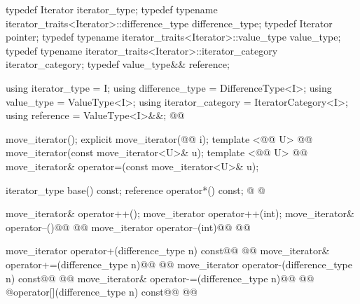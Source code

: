 %
\begin{codeblock}
namespace std {
  template <@@>
    @@
  class move_iterator {
  public:
\end{codeblock}\begin{removedblock}\begin{codeblock}
    typedef Iterator                                              iterator_type;
    typedef typename iterator_traits<Iterator>::difference_type   difference_type;
    typedef Iterator                                              pointer;
    typedef typename iterator_traits<Iterator>::value_type        value_type;
    typedef typename iterator_traits<Iterator>::iterator_category iterator_category;
    typedef value_type&&                                          reference;
\end{codeblock}\end{removedblock}\begin{addedblock}\begin{codeblock}
    using iterator_type = I;
    using difference_type = DifferenceType<I>;
    using value_type = ValueType<I>;
    using iterator_category = IteratorCategory<I>;
    using reference = ValueType<I>&&;
    @@
\end{codeblock}\end{addedblock}\begin{codeblock}

    move_iterator();
    explicit move_iterator(@@ i);
    template <@@ U>
      @@
    move_iterator(const move_iterator<U>& u);
    template <@@ U>
      @@
    move_iterator& operator=(const move_iterator<U>& u);

    iterator_type base() const;
    reference operator*() const;
    @ @

    move_iterator& operator++();
    move_iterator operator++(int);
    move_iterator& operator--()@\removed{;}@
      @@
    move_iterator operator--(int)@\removed{;}@
      @@

    move_iterator operator+(difference_type n) const@\removed{;}@
      @@
    move_iterator& operator+=(difference_type n)@\removed{;}@
      @@
    move_iterator operator-(difference_type n) const@\removed{;}@
      @@
    move_iterator& operator-=(difference_type n)@\removed{;}@
      @@
    @\unspec@ operator[](difference_type n) const@\removed{;}@
      @@


\end{codeblock}
